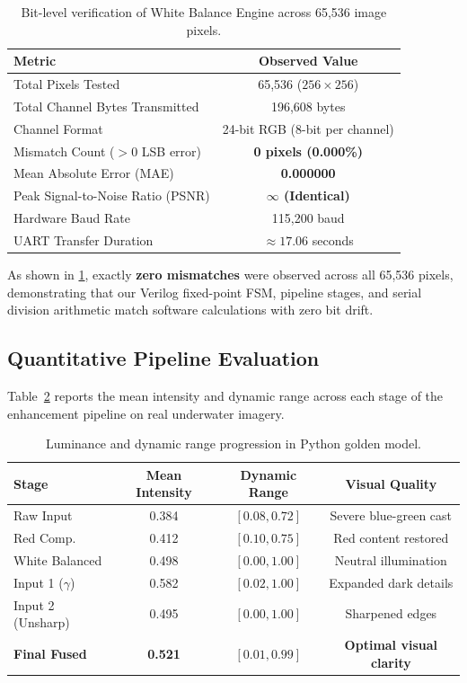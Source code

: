 \documentclass[10pt,twocolumn,letterpaper]{article}
\begin{document}
\begin{table}[t]
  \centering
  \small
  \caption{Bit-level verification of White Balance Engine across 65,536 image pixels.}
  \label{tab:wb_verification}
  \begin{tabular}{lc}
    \toprule
    Metric & Observed Value \\
    \midrule
    Total Pixels Tested & 65,536 ($256 \times 256$) \\
    Total Channel Bytes Transmitted & 196,608 bytes \\
    Channel Format & 24-bit RGB (8-bit per channel) \\
    Mismatch Count ($>0$ LSB error) & \textbf{0 pixels (0.000\%)} \\
    Mean Absolute Error (MAE) & \textbf{0.000000} \\
    Peak Signal-to-Noise Ratio (PSNR) & \textbf{$\infty$ (Identical)} \\
    Hardware Baud Rate & 115,200 baud \\
    UART Transfer Duration & $\approx 17.06$ seconds \\
    \bottomrule
  \end{tabular}
\end{table}

As shown in \cref{tab:wb_verification}, exactly \textbf{zero mismatches} were observed across all 65,536 pixels, demonstrating that our Verilog fixed-point FSM, pipeline stages, and serial division arithmetic match software calculations with zero bit drift.

\subsection{Quantitative Pipeline Evaluation}

Table~\ref{tab:stat_summary} reports the mean intensity and dynamic range across each stage of the enhancement pipeline on real underwater imagery.

\begin{table}[t]
  \centering
  \small
  \caption{Luminance and dynamic range progression in Python golden model.}
  \label{tab:stat_summary}
  \begin{tabular}{lccc}
    \toprule
    Stage & Mean Intensity & Dynamic Range & Visual Quality \\
    \midrule
    Raw Input & 0.384 & $[0.08, 0.72]$ & Severe blue-green cast \\
    Red Comp. & 0.412 & $[0.10, 0.75]$ & Red content restored \\
    White Balanced & 0.498 & $[0.00, 1.00]$ & Neutral illumination \\
    Input 1 ($\gamma$) & 0.582 & $[0.02, 1.00]$ & Expanded dark details \\
    Input 2 (Unsharp) & 0.495 & $[0.00, 1.00]$ & Sharpened edges \\
    \textbf{Final Fused} & \textbf{0.521} & $\mathbf{[0.01, 0.99]}$ & \textbf{Optimal visual clarity} \\
    \bottomrule
  \end{tabular}
\end{table}
\end{document}
